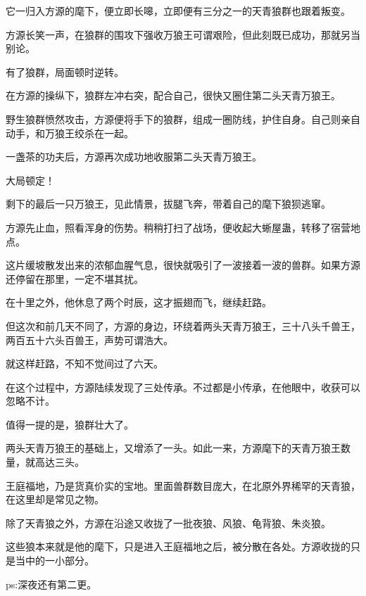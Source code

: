 \begin{this_body}
它一归入方源的麾下，便立即长嗥，立即便有三分之一的天青狼群也跟着叛变。

方源长笑一声，在狼群的围攻下强收万狼王可谓艰险，但此刻既已成功，那就另当别论。

有了狼群，局面顿时逆转。

在方源的操纵下，狼群左冲右突，配合自己，很快又圈住第二头天青万狼王。

野生狼群愤然攻击，方源便将手下的狼群，组成一圈防线，护住自身。自己则亲自动手，和万狼王绞杀在一起。

一盏茶的功夫后，方源再次成功地收服第二头天青万狼王。

大局顿定！

剩下的最后一只万狼王，见此情景，拔腿飞奔，带着自己的麾下狼狈逃窜。

方源先止血，照看浑身的伤势。稍稍打扫了战场，便收起大蜥屋蛊，转移了宿营地点。

这片缓坡散发出来的浓郁血腥气息，很快就吸引了一波接着一波的兽群。如果方源还停留在那里，一定不堪其扰。

在十里之外，他休息了两个时辰，这才振翅而飞，继续赶路。

但这次和前几天不同了，方源的身边，环绕着两头天青万狼王，三十八头千兽王，两百五十六头百兽王，声势可谓浩大。

就这样赶路，不知不觉间过了六天。

在这个过程中，方源陆续发现了三处传承。不过都是小传承，在他眼中，收获可以忽略不计。

值得一提的是，狼群壮大了。

两头天青万狼王的基础上，又增添了一头。如此一来，方源麾下的天青万狼王数量，就高达三头。

王庭福地，乃是货真价实的宝地。里面兽群数目庞大，在北原外界稀罕的天青狼，在这里却是常见之物。

除了天青狼之外，方源在沿途又收拢了一批夜狼、风狼、龟背狼、朱炎狼。

这些狼本来就是他的麾下，只是进入王庭福地之后，被分散在各处。方源收拢的只是当中的一小部分。

ps:深夜还有第二更。

\end{this_body}


